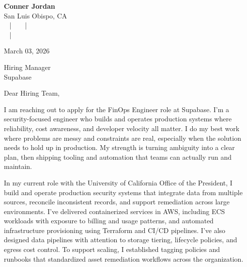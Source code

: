 \documentclass[letterpaper,11pt]{article}
\newcommand{\companyname}{Supabase}
\begin{document}
\begin{center}
  {\Huge \textbf{Conner Jordan}}\\[4pt]
  {\Large San Luis Obispo, CA}\\[4pt]
  \href{tel:+18059759793}{
    } ~ | ~
  \href{mailto:connercharlesjordan@gmail.com}{
    } ~ | ~
   \\
  \href{https://www.linkedin.com/in/conner-jordan-4b268514a/}{
    } ~ | ~
  \href{https://github.com/cjordan223}{
    }
\end{center}

\vspace{16pt}

\begin{flushright}
March 03, 2026
\end{flushright}

Hiring Manager\\
\companyname

\vspace{26pt}

\noindent
Dear Hiring Team,

\vspace{16pt}

I am reaching out to apply for the FinOps Engineer role at Supabase. I’m a security-focused engineer who builds and operates production systems where reliability, cost awareness, and developer velocity all matter. I do my best work where problems are messy and constraints are real, especially when the solution needs to hold up in production. My strength is turning ambiguity into a clear plan, then shipping tooling and automation that teams can actually run and maintain.

\vspace{16pt}

In my current role with the University of California Office of the President, I build and operate production security systems that integrate data from multiple sources, reconcile inconsistent records, and support remediation across large environments. I’ve delivered containerized services in AWS, including ECS workloads with exposure to billing and usage patterns, and automated infrastructure provisioning using Terraform and CI/CD pipelines. I’ve also designed data pipelines with attention to storage tiering, lifecycle policies, and egress cost control. To support scaling, I established tagging policies and runbooks that standardized asset remediation workflows across the organization.
\end{document}
